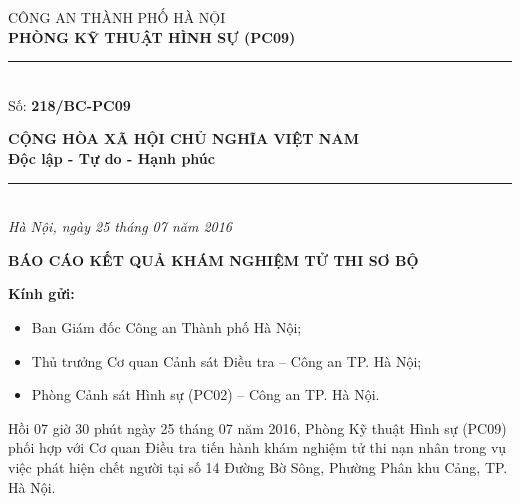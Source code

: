 \documentclass[12pt,a4paper]{article}
\begin{document}
\noindent
\begin{minipage}[t]{0.46\textwidth}
    \begin{center}
        \fontsize{11pt}{13pt}\selectfont
        CÔNG AN THÀNH PHỐ HÀ NỘI\\
        \textbf{PHÒNG KỸ THUẬT HÌNH SỰ (PC09)}\\[-0.2em]
        \rule{3.2cm}{0.6pt}\\[0.25cm]
        \fontsize{11pt}{13pt}\selectfont Số: \textbf{218/BC-PC09}
    \end{center}
\end{minipage}
\hfill
\begin{minipage}[t]{0.52\textwidth}
    \begin{center}
        \fontsize{11pt}{13pt}\selectfont
        \textbf{CỘNG HÒA XÃ HỘI CHỦ NGHĨA VIỆT NAM}\\
        \textbf{Độc lập - Tự do - Hạnh phúc}\\[-0.2em]
        \rule{3.6cm}{0.6pt}\\[0.25cm]
        \textit{Hà Nội, ngày 25 tháng 07 năm 2016}
    \end{center}
\end{minipage}

\vspace{0.5cm}

\begin{center}
    \textbf{\Large BÁO CÁO KẾT QUẢ KHÁM NGHIỆM TỬ THI SƠ BỘ}\\[0.15cm]
    \textit{}
\end{center}

\vspace{0.3cm}

\textbf{Kính gửi:}

\begin{itemize}[leftmargin=*, itemsep=2pt, topsep=2pt, parsep=0pt]
  \item Ban Giám đốc Công an Thành phố Hà Nội;
  \item Thủ trưởng Cơ quan Cảnh sát Điều tra – Công an TP. Hà Nội;
  \item Phòng Cảnh sát Hình sự (PC02) – Công an TP. Hà Nội.

\end{itemize}
Hồi 07 giờ 30 phút ngày 25 tháng 07 năm 2016, Phòng Kỹ thuật Hình sự (PC09) phối hợp với Cơ quan Điều tra tiến hành khám nghiệm tử thi nạn nhân trong vụ việc phát hiện chết người tại số 14 Đường Bờ Sông, Phường Phân khu Cảng, TP. Hà Nội.
\end{document}
